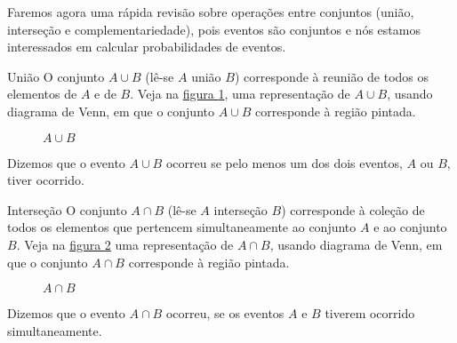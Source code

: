 Faremos agora uma rápida revisão sobre operações entre conjuntos (união, interseção e complementariedade), pois eventos são conjuntos e nós estamos interessados em calcular probabilidades de eventos.

\begin{observationtitle}{União}
O conjunto \(A\cup B\) (lê-se \(A\)  união \(B\)) corresponde à reunião de todos os elementos de \(A\) e de \(B\). Veja na \hyperref[aub]{figura \ref{aub}}, uma representação de \(A\cup B\), usando diagrama de Venn, em que o conjunto \(A\cup B\) corresponde à região pintada.

\begin{figure}[H]
\centering

\caption{\(A\cup B\)}
\label{aub}
\end{figure}


Dizemos que o evento \(A\cup B\) ocorreu se pelo menos um dos dois eventos, \(A\) ou \(B\), tiver ocorrido.
\end{observationtitle}

\begin{observationtitle}{Interseção}
O conjunto \(A\cap B\) (lê-se \(A\) interseção \(B\)) corresponde à coleção de todos os elementos que pertencem simultaneamente ao conjunto \(A\) e ao conjunto \(B\). Veja na \hyperref[intersecao]{figura \ref{intersecao}} uma representação de \(A\cap B\), usando diagrama de Venn, em que o conjunto \(A\cap B\) corresponde à região pintada.
\begin{figure}[H]
\centering

\caption{\(A\cap B\)}
\label{intersecao}
\end{figure}


Dizemos que o evento \(A \cap B\) ocorreu, se os eventos \(A\) e \(B\) tiverem ocorrido simultaneamente.
\end{observationtitle}


